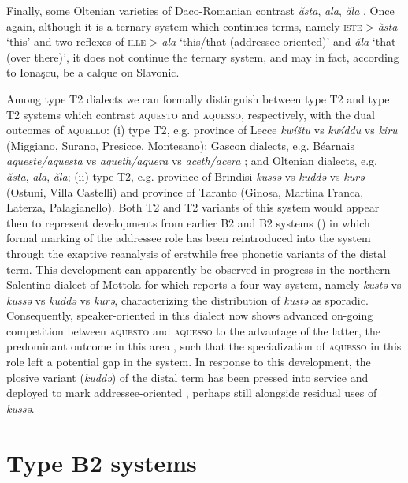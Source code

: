 \documentclass[output=paper]{langsci/langscibook}
\begin{document}
Finally, some Oltenian varieties of Daco-Romanian contrast \emph{ăsta},
\emph{ala}, \emph{ăla} \citep{Ionascu:1960a}. Once again, although it is a
ternary system which continues  terms, namely \textsc{iste} > \emph{ăsta}
‘this’ and two reflexes of \textsc{ille} > \emph{ala} ‘this/that
(ad\-dress\-ee-oriented)’ and \emph{ăla} ‘that (over there)’, it does not continue
the  ternary system, and may in fact, according to Ionaşcu, be a calque on
Slavonic.

Among type T2 dialects we can formally distinguish between type
T2 and type T2 systems which contrast \textsc{aquesto} and
\textsc{aquesso}, respectively, with the dual outcomes of \textsc{aquello}: (i)
type T2, e.g. province of Lecce \emph{kwíštu} vs \emph{kwíddu} vs
\emph{kiru} (Miggiano, Surano, Presicce, Montesano); Gascon dialects, e.g.
Béarnais \emph{aqueste/aquesta} vs \emph{aqueth/aquera} vs \emph{aceth/acera}
\citep[188]{Rohlfs:1970ab}; and Oltenian dialects, e.g. \emph{ăsta},
\emph{ala}, \emph{ăla}; (ii) type T2, e.g. province of Brindisi
\emph{kussə} vs \emph{kuddə} vs \emph{kurə} (Ostuni, Villa Castelli) and
province of Taranto (Ginosa, Martina Franca, Laterza, Palagianello). Both
T2 and T2 variants of this system would appear then to
represent developments from earlier B2 and B2 systems
() in which formal marking of the
addressee role has been reintroduced into the system through the exaptive
reanalysis of erstwhile free phonetic variants of the distal term. This
development can apparently be observed in progress in the northern Salentino
dialect of Mottola for which \citet[157, 160]{Mancarella:1998a} reports a
four-way system, namely \emph{kustə} vs \emph{kussə} vs \emph{kuddə} vs
\emph{kurə}, characterizing the distribution of \emph{kustə} as sporadic.
Consequently, speaker-oriented  in this dialect now shows advanced
on-going competition between \textsc{aquesto} and \textsc{aquesso} to the
advantage of the latter, the predominant outcome in this area
\parencite[157]{Mancarella:1998a}, such that the specialization of
\textsc{aquesso} in this role left a potential gap in the system. In response
to this development, the plosive variant (\emph{kuddə}) of the distal term has
been pressed into service and deployed to mark addressee-oriented ,
perhaps still alongside residual uses of \emph{kussə}.

\section{Type B2 systems}\label{bkm:Ref370483109}
\end{document}

